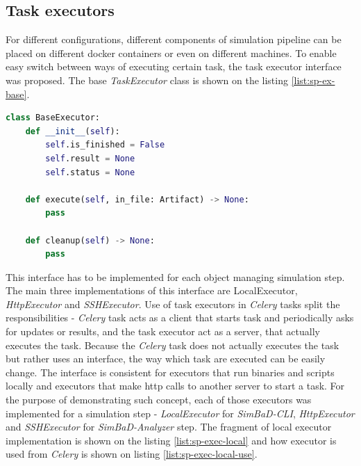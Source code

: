 \subsection{Task executors}
For different configurations, different components of simulation pipeline can be placed on different docker containers or even on different machines. To enable easy switch between ways of executing certain task, the task executor interface was proposed. The base \textit{TaskExecutor} class is shown on the listing \ref{list:sp-ex-base}.
\begin{lstlisting}[label=list:sp-ex-base,caption=Base executor, basicstyle=\footnotesize\ttfamily, language=python]
class BaseExecutor:
    def __init__(self):
        self.is_finished = False
        self.result = None
        self.status = None

    def execute(self, in_file: Artifact) -> None:
        pass

    def cleanup(self) -> None:
        pass
\end{lstlisting}
This interface has to be implemented for each object managing simulation step. The main three implementations of this interface are LocalExecutor, \textit{HttpExecutor} and \textit{SSHExecutor}. Use of task executors in \textit{Celery} tasks split the responsibilities - \textit{Celery} task acts as a client that starts task and periodically asks for updates or results, and the task executor act as a server, that actually executes the task. Because the \textit{Celery} task does not actually executes the task but rather uses an interface, the way which task are executed can be easily change. The interface is consistent for executors that run binaries and scripts locally and executors that make http calls to another server to start a task.
For the purpose of demonstrating such concept, each of those executors was implemented for a simulation step - \textit{LocalExecutor} for \textit{SimBaD-CLI}, \textit{HttpExecutor} and \textit{SSHExecutor} for \textit{SimBaD-Analyzer} step. The fragment of local executor implementation is shown on the listing \ref{list:sp-exec-local} and how executor is used from \textit{Celery} is shown on listing \ref{list:sp-exec-local-use}.
